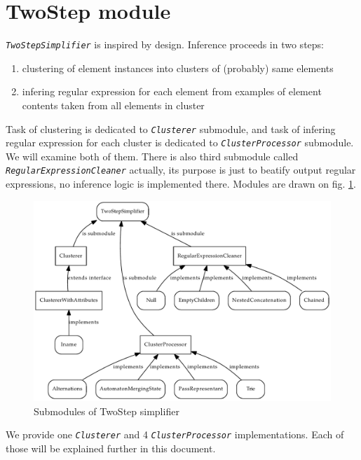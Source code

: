 \documentclass[a4paper,10pt,oneside]{article}
\newcommand{\myscale}{0.74}
\newcommand{\jmodule}[1]{\texttt{\textit{#1}}}
\begin{document}
\section{TwoStep module}
\jmodule{TwoStepSimplifier} is inspired by \cite{1802522} design. Inference proceeds in two steps:
\begin{enumerate}
	\item clustering of element instances into clusters of (probably) same elements
	\item infering regular expression for each element from examples of element contents taken from all elements in cluster
\end{enumerate}
Task of clustering is dedicated to \jmodule{Clusterer} submodule, and task of infering regular expression for each cluster is dedicated to \jmodule{ClusterProcessor} submodule. We will examine both of them.
There is also third submodule called \jmodule{RegularExpressionCleaner} actually, its purpose is just to beatify output regular expressions, no inference logic is implemented there. 
Modules are drawn on fig. \ref{twostep_modules}.
\begin{figure}
	\centering\includegraphics[scale=\myscale]{twostep_modules}
	\caption{Submodules of TwoStep simplifier} \label{twostep_modules}
\end{figure}
We provide one \jmodule{Clusterer} and 4 \jmodule{ClusterProcessor} implementations.
Each of those will be explained further in this document.
\end{document}
